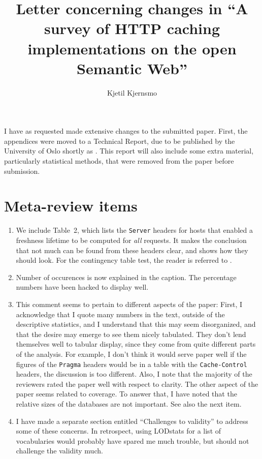 \documentclass{article}
\title{Letter concerning changes in ``A survey of HTTP caching implementations on the open Semantic Web''}
\author{Kjetil Kjernsmo}
\newcommand{\httph}[1]{\texttt{#1}}
\begin{document}
\maketitle

I have as requested made extensive changes to the submitted
paper. First, the appendices were moved to a Technical Report, due to
be published by the University of Oslo shortly as
\cite{kjernsmo_add_survey_2015}. This report will also include some
extra material, particularly statistical methods, that were removed
from the paper before submission.

\section{Meta-review items}

\begin{enumerate}

\item We include Table~2, which lists the \httph{Server} headers for
  hosts that enabled a freshness lifetime to be computed for
  \emph{all} requests. It makes the conclusion that not much can be
  found from these headers clear, and shows how they should look. For
  the contingency table test, the reader is referred to
  \cite{kjernsmo_add_survey_2015}.

\item Number of occurences is now explained in the caption. The
  percentage numbers have been hacked to display well.

\item This comment seems to pertain to different aspects of the paper:
  First, I acknowledge that I quote many numbers in the text, outside
  of the descriptive statistics, and I understand that this may seem
  disorganized, and that the desire may emerge to see them nicely
  tabulated. They don't lend themselves well to tabular display, since
  they come from quite different parts of the analysis. For example, I
  don't think it would serve paper well if the figures of the
  \httph{Pragma} headers would be in a table with the
  \httph{Cache-Control} headers, the discussion is too
  different. Also, I note that the majority of the reviewers rated the
  paper well with respect to clarity. The other aspect of the paper
  seems related to coverage. To answer that, I have noted that the
  relative sizes of the databases are not important. See also the next
  item.

\item I have made a separate section entitled ``Challenges to
  validity'' to address some of these concerns. In retrospect, using
  LODstats for a list of vocabularies would probably have spared me
  much trouble, but should not challenge the validity much.


\end{enumerate}
\end{document}
